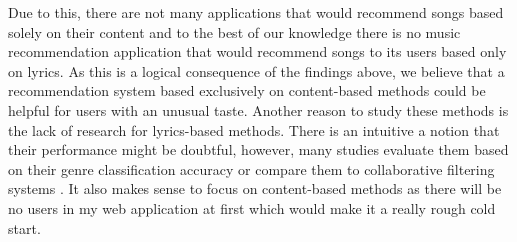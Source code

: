 Due to this, there are not many applications that would recommend songs based solely on their content and to the best of our knowledge there is no music recommendation application that would recommend songs to its users based only on lyrics. As this is a logical consequence of the findings above, we believe that a recommendation system based exclusively on content-based methods could be helpful for users with an unusual taste. Another reason to study these methods is the lack of research for lyrics-based methods. There is an intuitive a notion that their performance might be doubtful, however, many studies evaluate them based on their genre classification accuracy \cite{DBLP:journals/corr/Tsaptsinos17} or compare them to collaborative filtering systems \cite{Gossi2016LyricBasedMR}. It also makes sense to focus on content-based methods as there will be no users in my web application at first which would make it a really rough cold start.

